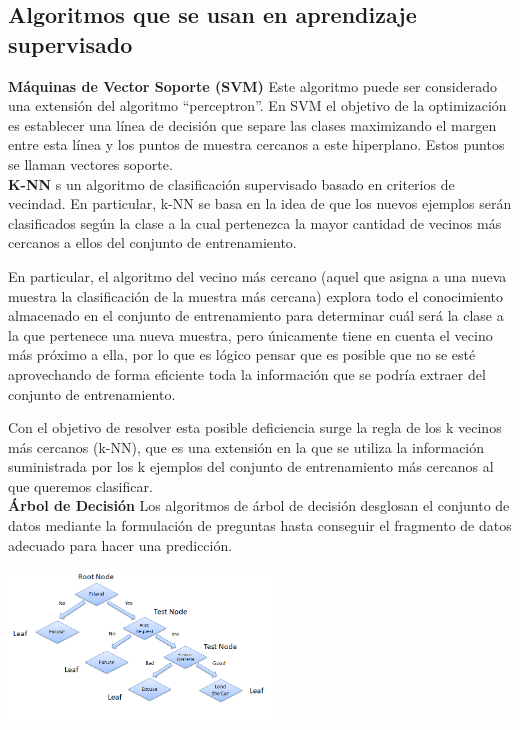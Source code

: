 \documentclass[%
 reprint,
 amsmath,amssymb,
 aps,
]{revtex4-1}
\begin{document}
{%
\subsection{Algoritmos que se usan en aprendizaje supervisado}	
 \textbf{Máquinas de Vector Soporte (SVM)}
Este algoritmo puede ser considerado una extensión del algoritmo “perceptron”. En SVM el objetivo de la optimización es establecer una línea de decisión que separe las clases maximizando el margen entre esta línea y los puntos de muestra cercanos a este hiperplano. Estos puntos se llaman vectores soporte.\\

\textbf{K-NN}
s un algoritmo de clasificación supervisado basado en criterios de vecindad. En particular, k-NN se basa en la idea de que los nuevos ejemplos serán clasificados según la clase a la cual pertenezca la mayor cantidad de vecinos más cercanos a ellos del conjunto de entrenamiento.

En particular, el algoritmo del vecino más cercano (aquel que asigna a una nueva muestra la clasificación de la muestra más cercana) explora todo el conocimiento almacenado en el conjunto de entrenamiento para determinar cuál será la clase a la que pertenece una nueva muestra, pero únicamente tiene en cuenta el vecino más próximo a ella, por lo que es lógico pensar que es posible que no se esté aprovechando de forma eficiente toda la información que se podría extraer del conjunto de entrenamiento.

Con el objetivo de resolver esta posible deficiencia surge la regla de los k vecinos más cercanos (k-NN), que es una extensión en la que se utiliza la información suministrada por los k ejemplos del conjunto de entrenamiento más cercanos al que queremos clasificar.\\
\textbf{Árbol de Decisión}
Los algoritmos de árbol de decisión desglosan el conjunto de datos mediante la formulación de preguntas hasta conseguir el fragmento de datos adecuado para hacer una predicción.

 \begin{center}
\includegraphics[width=7cm]{./Imagenes/arbol}
\end{center}

}
\end{document}
